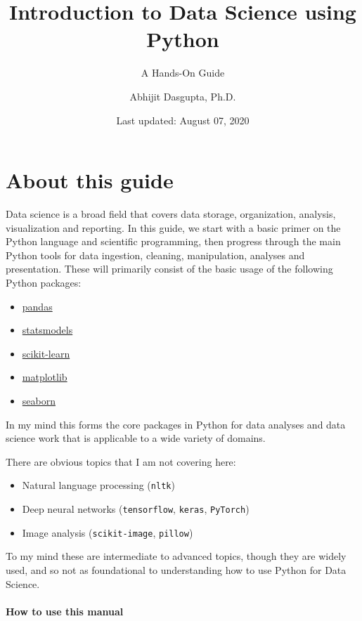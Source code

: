 \documentclass[
  letterpaper,
]{scrbook}
\title{Introduction to Data Science using Python}
\subtitle{A Hands-On Guide}
\author{Abhijit Dasgupta, Ph.D.}
\date{Last updated: August 07, 2020}
\providecommand{\tightlist}{%
  \setlength{\itemsep}{0pt}\setlength{\parskip}{0pt}}
\begin{document}
\maketitle

{
\setcounter{tocdepth}{1}
\tableofcontents
}
\hypertarget{about-this-guide}{%
\chapter{About this guide}\label{about-this-guide}}

Data science is a broad field that covers data storage, organization, analysis, visualization and reporting. In this guide, we start with a basic primer on the Python language and scientific programming, then progress through the main Python tools for data ingestion, cleaning, manipulation, analyses and presentation. These will primarily consist of the basic usage of the following Python packages:

\begin{itemize}
\tightlist
\item
  \href{https://pandas.pydata.org}{pandas}
\item
  \href{https://www.statsmodels.org}{statsmodels}
\item
  \href{https://scikit-learn.org}{scikit-learn}
\item
  \href{https://matplotlib.org}{matplotlib}
\item
  \href{https://seaborn.pydata.org}{seaborn}
\end{itemize}

In my mind this forms the core packages in Python for data analyses and data science work that is applicable to a wide variety of domains.

There are obvious topics that I am not covering here:

\begin{itemize}
\tightlist
\item
  Natural language processing (\texttt{nltk})
\item
  Deep neural networks (\texttt{tensorflow}, \texttt{keras}, \texttt{PyTorch})
\item
  Image analysis (\texttt{scikit-image}, \texttt{pillow})
\end{itemize}

To my mind these are intermediate to advanced topics, though they are widely used, and so not as foundational to understanding how to use Python for Data Science.

\hypertarget{how-to-use-this-manual}{%
\subsubsection*{How to use this manual}\label{how-to-use-this-manual}}
\end{document}
